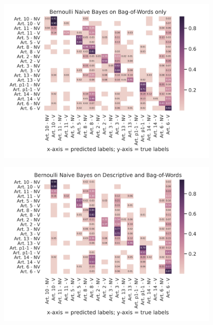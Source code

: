 \documentclass{article}
\begin{document}
\begin{figure}[!htb]
    \centering
    \includegraphics[scale=0.7]{data/analysis/cm/multiclass_cm_test_bernoulli_naive_bayes_bag-of-words_only.png}  
\end{figure}
\begin{figure}[!htb]
    \centering
    \includegraphics[scale=0.7]{data/analysis/cm/multiclass_cm_test_bernoulli_naive_bayes_descriptive_and_bag-of-words.png}  
\end{figure}
\end{document}
